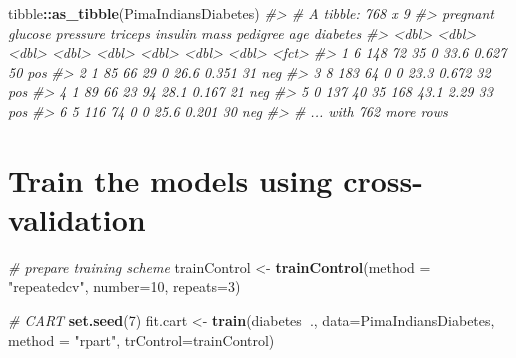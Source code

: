 \documentclass[]{book}
\newenvironment{Shaded}{\begin{snugshade}}{\end{snugshade}}
\newcommand{\CommentTok}[1]{\textcolor[rgb]{0.56,0.35,0.01}{\textit{#1}}}
\newcommand{\DataTypeTok}[1]{\textcolor[rgb]{0.13,0.29,0.53}{#1}}
\newcommand{\DecValTok}[1]{\textcolor[rgb]{0.00,0.00,0.81}{#1}}
\newcommand{\KeywordTok}[1]{\textcolor[rgb]{0.13,0.29,0.53}{\textbf{#1}}}
\newcommand{\NormalTok}[1]{#1}
\newcommand{\OperatorTok}[1]{\textcolor[rgb]{0.81,0.36,0.00}{\textbf{#1}}}
\newcommand{\StringTok}[1]{\textcolor[rgb]{0.31,0.60,0.02}{#1}}
\begin{document}
\begin{Shaded}
\begin{Highlighting}[]
\NormalTok{tibble}\OperatorTok{::}\KeywordTok{as_tibble}\NormalTok{(PimaIndiansDiabetes)}
\CommentTok{#> # A tibble: 768 x 9}
\CommentTok{#>   pregnant glucose pressure triceps insulin  mass pedigree   age diabetes}
\CommentTok{#>      <dbl>   <dbl>    <dbl>   <dbl>   <dbl> <dbl>    <dbl> <dbl> <fct>   }
\CommentTok{#> 1        6     148       72      35       0  33.6    0.627    50 pos     }
\CommentTok{#> 2        1      85       66      29       0  26.6    0.351    31 neg     }
\CommentTok{#> 3        8     183       64       0       0  23.3    0.672    32 pos     }
\CommentTok{#> 4        1      89       66      23      94  28.1    0.167    21 neg     }
\CommentTok{#> 5        0     137       40      35     168  43.1    2.29     33 pos     }
\CommentTok{#> 6        5     116       74       0       0  25.6    0.201    30 neg     }
\CommentTok{#> # ... with 762 more rows}
\end{Highlighting}
\end{Shaded}

\hypertarget{train-the-models-using-cross-validation}{%
\section{Train the models using cross-validation}\label{train-the-models-using-cross-validation}}

\begin{Shaded}
\begin{Highlighting}[]
\CommentTok{# prepare training scheme}
\NormalTok{trainControl <-}\StringTok{ }\KeywordTok{trainControl}\NormalTok{(}\DataTypeTok{method =} \StringTok{"repeatedcv"}\NormalTok{, }
                             \DataTypeTok{number=}\DecValTok{10}\NormalTok{, }
                             \DataTypeTok{repeats=}\DecValTok{3}\NormalTok{)}
\end{Highlighting}
\end{Shaded}

\begin{Shaded}
\begin{Highlighting}[]
\CommentTok{# CART}
\KeywordTok{set.seed}\NormalTok{(}\DecValTok{7}\NormalTok{)}
\NormalTok{fit.cart <-}\StringTok{ }\KeywordTok{train}\NormalTok{(diabetes}\OperatorTok{~}\NormalTok{., }\DataTypeTok{data=}\NormalTok{PimaIndiansDiabetes, }
                  \DataTypeTok{method =} \StringTok{"rpart"}\NormalTok{, }\DataTypeTok{trControl=}\NormalTok{trainControl)}
\end{Highlighting}
\end{Shaded}
\end{document}
